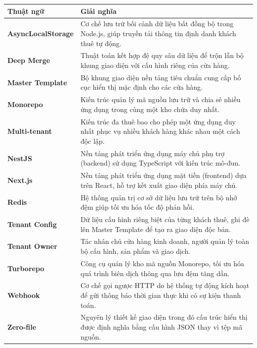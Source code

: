 \documentclass[../main.tex]{subfiles}
\begin{document}
\begin{longtable}{l p{14cm}}
	\hline
   \textbf{Thuật ngữ} & \textbf{Giải nghĩa} \\ \hline 
	\textbf{AsyncLocalStorage} & Cơ chế lưu trữ bối cảnh dữ liệu bất đồng bộ trong Node.js, giúp truyền tải thông tin định danh khách thuê tự động. \\
	\textbf{Deep Merge} & Thuật toán kết hợp đệ quy sâu dữ liệu để trộn lẫn bộ khung giao diện với cấu hình riêng của cửa hàng. \\
	\textbf{Master Template} & Bộ khung giao diện nền tảng tiêu chuẩn cung cấp bố cục hiển thị mặc định cho các cửa hàng. \\
	\textbf{Monorepo} & Kiến trúc quản lý mã nguồn lưu trữ và chia sẻ nhiều ứng dụng trong cùng một kho chứa duy nhất. \\
	\textbf{Multi-tenant} & Kiến trúc đa thuê bao cho phép một ứng dụng duy nhất phục vụ nhiều khách hàng khác nhau một cách độc lập. \\
	\textbf{NestJS} & Nền tảng phát triển ứng dụng máy chủ phụ trợ (backend) sử dụng TypeScript với kiến trúc mô-đun. \\
	\textbf{Next.js} & Nền tảng phát triển ứng dụng mặt tiền (frontend) dựa trên React, hỗ trợ kết xuất giao diện phía máy chủ. \\
	\textbf{Redis} & Hệ thống quản trị cơ sở dữ liệu lưu trữ trên bộ nhớ đệm giúp tối ưu hóa tốc độ phản hồi. \\
	\textbf{Tenant Config} & Dữ liệu cấu hình riêng biệt của từng khách thuê, ghi đè lên Master Template để tạo ra giao diện độc bản. \\
	\textbf{Tenant Owner} & Tác nhân chủ cửa hàng kinh doanh, người quản lý toàn bộ cấu hình, sản phẩm và giao dịch. \\
	\textbf{Turborepo} & Công cụ quản lý kho mã nguồn Monorepo, tối ưu hóa quá trình biên dịch thông qua lưu đệm tăng dần. \\
	\textbf{Webhook} & Cơ chế gọi ngược HTTP do hệ thống tự động kích hoạt để gửi thông báo thời gian thực khi có sự kiện thanh toán. \\
	\textbf{Zero-file} & Nguyên lý thiết kế giao diện trong đó cấu trúc hiển thị được định nghĩa bằng cấu hình JSON thay vì tệp mã nguồn. \\

    \hline
\end{longtable}
\end{document}
